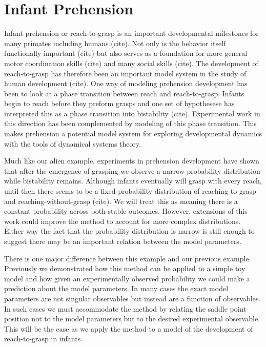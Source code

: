 \documentclass[letterpaper]{article}
\begin{document}
\section{Infant Prehension}

Infant prehension or reach-to-grasp is an important developmental milestones 
for many primates including humans (cite). Not only is the behavior itself
functionally important (cite) but also serves as a foundation for more general motor
coordination skills (cite) and many social skills (cite). The development of 
reach-to-grasp
has therefore been an important model system in the study of human development (cite). 
One way of modeling prehension development has been to look at a phase transition
between reach and reach-to-grasp. Infants begin to reach before they preform grasps and
one set of hypothesese has interpreted this as a phase transition into bistability (cite). 
Experimental work in this direction has been complemented by modeling of this phase
transition. This makes prehension a potential model system for exploring developmental
dynamics with the tools of dynamical systems theory.

Much like our alien example, experiments in prehension development 
have shown that after
the emergence of grasping we observe a narrow probability distribution 
while bistability
remains. Although infants eventually will grasp with every reach, until 
then there seems to
be a fixed probability distribution of reaching-to-grasp and 
reaching-without-grasp (cite).
We will treat this as meaning there is a constant probability across 
both stable outcomes.
However, extensions of this work could improve the method to account for
more complex distributions.
Either way the fact that the probability distribution is narrow is still 
enough to suggest
there may be an important relation between the model parameters.

There is one major difference between this example and our previous example.
Previously we demonstrated how this method can be applied to a simple
toy model and how given an experimentally observed probability we could make a prediction
about the model parameters. In many cases the exact model parameters are 
not singular observables but instead are a function of observables. In such cases we 
must accommodate the method by relating the saddle point position not to the model
parameters but to the desired experimental observable. 
This will be the case as we apply the method to a model of the development of 
reach-to-grasp in infants. 
\end{document}
